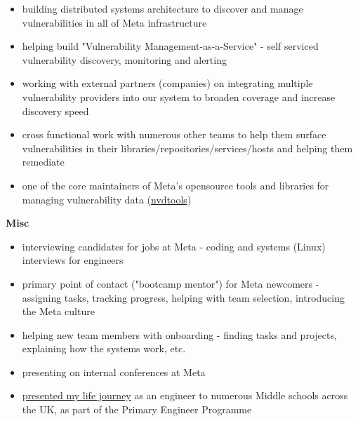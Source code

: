 \begin{cventries}
{\begin{cvitems}
{          \begin{itemize}
            \item {building distributed systems architecture to discover and manage vulnerabilities in all of Meta infrastructure}
            \item {helping build "Vulnerability Management-as-a-Service" - self serviced vulnerability discovery, monitoring and alerting}
            \item {working with external partners (companies) on integrating multiple vulnerability providers into our system to broaden coverage and increase discovery speed}
            \item {cross functional work with numerous other teams to help them surface vulnerabilities in their libraries/repositories/services/hosts and helping them remediate}
            \item {one of the core maintainers of Meta's opensource tools and libraries for managing vulnerability data (\href{https://github.com/facebookincubator/nvdtools}{nvdtools})}
          \end{itemize}
        }
        \item {
          \textbf{Misc}
          \begin{itemize}
            \item {interviewing candidates for jobs at Meta - coding and systems (Linux) interviews for engineers}
            \item {primary point of contact ("bootcamp mentor") for Meta newcomers - assigning tasks, tracking progress, helping with team selection, introducing the Meta culture}
            \item {helping new team members with onboarding - finding tasks and projects, explaining how the systems work, etc.}
            \item {presenting on internal conferences at Meta}
            \item {\href{https://www.youtube.com/watch?v=wP3OpdfOYok}{presented my life journey} as an engineer to numerous Middle schools across the UK, as part of the Primary Engineer Programme}
          \end{itemize}
        }
      \end{cvitems}
    }


\end{cventries}
